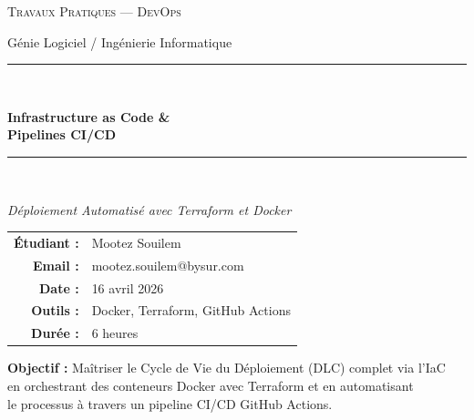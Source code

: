 \documentclass[12pt,a4paper]{report}
\begin{document}
\begin{titlepage}
  \centering
  \vspace*{1cm}

  {\scshape\Large Travaux Pratiques --- DevOps \par}
  \vspace{0.5cm}
  {\large Génie Logiciel / Ingénierie Informatique \par}
  \vspace{2cm}

  \rule{\linewidth}{1.5pt} \\[0.4cm]
  {\Huge\bfseries Infrastructure as Code \& \\ Pipelines CI/CD \par}
  \rule{\linewidth}{1.5pt} \\[0.5cm]

  \vspace{1cm}
  {\Large\itshape Déploiement Automatisé avec Terraform et Docker \par}
  \vspace{2cm}

  \begin{tabular}{rl}
    \textbf{Étudiant :}   & Mootez Souilem \\[4pt]
    \textbf{Email :}      & mootez.souilem@bysur.com \\[4pt]
    \textbf{Date :}       & 16 avril 2026 \\[4pt]
    \textbf{Outils :}     & Docker, Terraform, GitHub Actions \\[4pt]
    \textbf{Durée :}      & 6 heures \\
  \end{tabular}

  \vfill

  \begin{tcolorbox}[colback=codeblue!10, colframe=codeblue, width=0.85\textwidth]
    \centering
    \textbf{Objectif :} Maîtriser le Cycle de Vie du Déploiement (DLC) complet via l'IaC\\
    en orchestrant des conteneurs Docker avec Terraform et en automatisant\\
    le processus à travers un pipeline CI/CD GitHub Actions.
  \end{tcolorbox}

\end{titlepage}

\tableofcontents
\listoffigures
\clearpage
\end{document}
